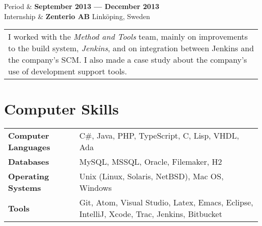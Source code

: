 \documentclass{cv-stylish}
\begin{document}
\begin{center}
\begin{InfoTable}
 Period & \textbf{September 2013 --- December 2013}\\
 Internship & \textbf{Zenterio AB} \hfill Linköping, Sweden\\
\end{InfoTable}
\begin{tabularx}{0.97\linewidth}{X}
I worked with the \emph{Method and Tools} team, mainly on improvements
to the build system, \emph{Jenkins}, and on integration between Jenkins
and the company's SCM. I also made a case study about the company's
use of development support tools.
\end{tabularx}




\section{Computer Skills}

\begin{tabular}{ @{} >{\bfseries}l @{\hspace{6ex}} l }
Computer Languages & C\#, Java, PHP, TypeScript, C, Lisp, VHDL, Ada \\
Databases & MySQL, MSSQL, Oracle, Filemaker, H2 \\
Operating Systems & Unix (Linux, Solaris, NetBSD), Mac OS, Windows\\
Tools & Git, Atom, Visual Studio, Latex, Emacs, Eclipse, IntelliJ,
        Xcode, Trac, Jenkins, Bitbucket
\end{tabular}


\end{center}
\end{document}
